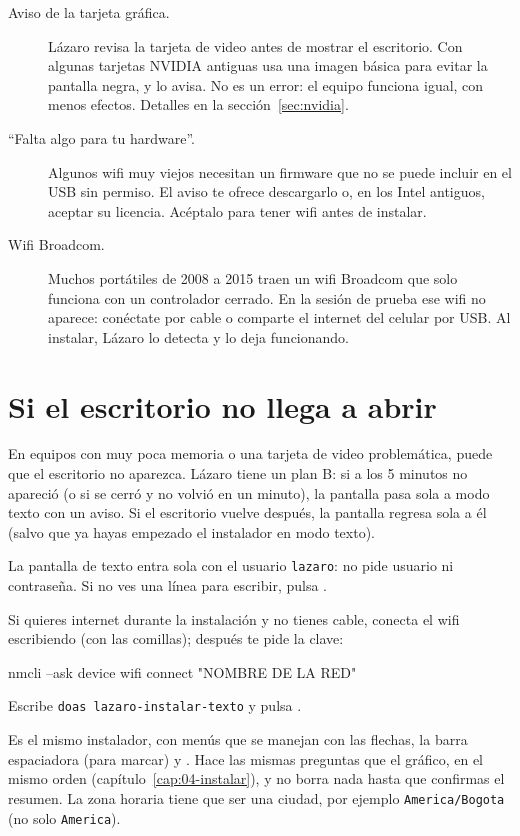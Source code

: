 \begin{description}
  \item[Aviso de la tarjeta gráfica.] Lázaro revisa la tarjeta de video
    antes de mostrar el escritorio. Con algunas tarjetas NVIDIA antiguas
    usa una imagen básica para evitar la pantalla negra, y lo avisa. No es
    un error: el equipo funciona igual, con menos efectos. Detalles en la
    sección~\ref{sec:nvidia}.
  \item[\enquote{Falta algo para tu hardware}.] Algunos wifi muy viejos
    necesitan un firmware que no se puede incluir en el USB sin permiso. El
    aviso te ofrece descargarlo o, en los Intel antiguos, aceptar su
    licencia. Acéptalo para tener wifi antes de instalar.
  \item[Wifi Broadcom.] Muchos portátiles de 2008 a 2015 traen un wifi
    Broadcom que solo funciona con un controlador cerrado. En la sesión de
    prueba ese wifi no aparece: conéctate por cable o comparte el internet
    del celular por USB. Al instalar, Lázaro lo detecta y lo deja
    funcionando.
\end{description}

\section{Si el escritorio no llega a abrir}\label{sec:instalar-texto}

En equipos con muy poca memoria o una tarjeta de video problemática, puede
que el escritorio no aparezca. Lázaro tiene un plan B: si a los 5 minutos
no apareció (o si se cerró y no volvió en un minuto), la pantalla pasa
sola a modo texto con un aviso. Si el escritorio vuelve después, la
pantalla regresa sola a él (salvo que ya hayas empezado el instalador en
modo texto).

\begin{pasos}
  \item La pantalla de texto entra sola con el usuario \texttt{lazaro}:
        no pide usuario ni contraseña. Si no ves una línea para escribir,
        pulsa .
  \item Si quieres internet durante la instalación y no tienes cable,
        conecta el wifi escribiendo (con las comillas); después te pide
        la clave:
\begin{terminal}
nmcli --ask device wifi connect "NOMBRE DE LA RED"
\end{terminal}
  \item Escribe \texttt{doas lazaro-instalar-texto} y pulsa .
\end{pasos}

Es el mismo instalador, con menús que se manejan con las flechas, la barra
espaciadora (para marcar) y . Hace las mismas preguntas que el
gráfico, en el mismo orden (capítulo~\ref{cap:04-instalar}), y no borra nada
hasta que confirmas el resumen. La zona horaria tiene que ser una ciudad,
por ejemplo \texttt{America/Bogota} (no solo \texttt{America}).

\fuentes
